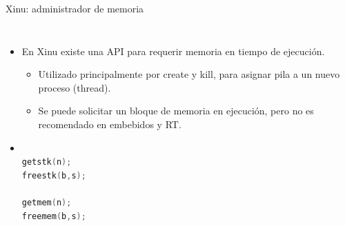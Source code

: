 \documentclass[8pt,aspectratio=169,compress]{beamer}
\begin{document}
\begin{frame}[fragile]{Xinu: administrador de memoria}

    \begin{columns}[onlytextwidth,T]
      \column{\dimexpr\linewidth-60mm-5mm}

	\begin{itemize}
\bigskip
  \item[Gestor de memoria] En Xinu existe una API para requerir memoria en tiempo de ejecución.

\bigskip
\begin{itemize}
\item Utilizado principalmente por create y kill, para asignar pila a un nuevo proceso (thread).

\bigskip
\item Se puede solicitar un bloque de memoria en ejecución, pero no es recomendado en embebidos y RT.
\end{itemize}

\bigskip
\item[API]

\begin{lstlisting}[language=c,basicstyle=\footnotesize]

getstk(n); 
freestk(b,s);

getmem(n);
freemem(b,s);
\end{lstlisting}

	\end{itemize}

      \column{50mm}

    \end{columns}
\end{frame}
\end{document}
